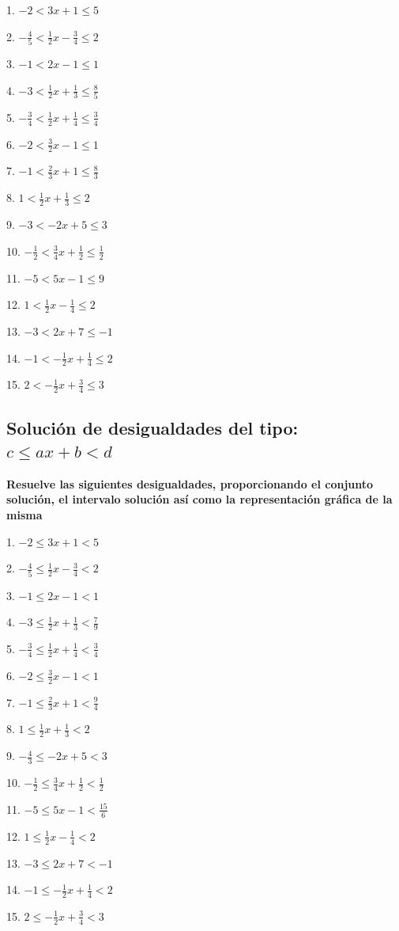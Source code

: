 \documentclass[]{book}
\begin{document}
\begin{multicols}{3}
1. $-2<3x+1\leq 5$

2. $-\frac{4}{5}< \frac{1}{2}x-\frac{3}{4}\leq2$

3. $-1<2x-1\leq 1$

4. $-3< \frac{1}{2}x+\frac{1}{3}\leq \frac{8}{5}$

5. $-\frac{3}{4}<\frac{1}{2}x+\frac{1}{4}\leq \frac{3}{4}$

6. $-2<\frac{3}{2}x-1\leq 1$

7. $-1<\frac{2}{3}x+1\leq \frac{8}{3}$

8. $1<\frac{1}{2}x+\frac{1}{3}\leq 2$

9. $-3< -2x+5\leq 3$

10. $-\frac{1}{2}<\frac{3}{4}x+\frac{1}{2}\leq \frac{1}{2}$

11. $-5<5x-1\leq 9$

12. $1<\frac{1}{2}x-\frac{1}{4}\leq 2$

13. $-3< 2x+7\leq -1$

14. $-1< -\frac{1}{2}x+\frac{1}{4}\leq 2$

15. $2<-\frac{1}{2}x+\frac{3}{4}\leq 3$
\end{multicols}

\subsection{\texorpdfstring{Solución de desigualdades del tipo:
\(c\leq ax+b <d\)}{Solución de desigualdades del tipo: c\textbackslash{}leq ax+b \textless{}d}}\label{soluciuxf3n-de-desigualdades-del-tipo-cleq-axb-d}

\textbf{Resuelve las siguientes desigualdades, proporcionando el
conjunto solución, el intervalo solución así como la representación
gráfica de la misma}

\begin{multicols}{3}
1. $-2\leq 3x+1<5$

2. $-\frac{4}{5}\leq \frac{1}{2}x-\frac{3}{4}<2$

3. $-1\leq 2x-1<1$

4. $-3\leq \frac{1}{2}x+\frac{1}{3}<\frac{7}{9}$

5. $-\frac{3}{4}\leq \frac{1}{2}x+\frac{1}{4}<\frac{3}{4}$

6. $-2\leq \frac{3}{2}x-1<1$

7. $-1\leq \frac{2}{3}x+1<\frac{9}{4}$

8. $1\leq \frac{1}{2}x+\frac{1}{3}<2$

9. $-\frac{4}{3}\leq -2x+5<3$

10. $-\frac{1}{2}\leq \frac{3}{4}x+\frac{1}{2}<\frac{1}{2}$

11. $-5\leq 5x-1<\frac{15}{6}$

12. $1\leq \frac{1}{2}x-\frac{1}{4}<2$

13. $-3\leq 2x+7<-1$

14. $-1\leq -\frac{1}{2}x+\frac{1}{4}<2$

15. $2\leq -\frac{1}{2}x+\frac{3}{4}<3$
\end{multicols}
\end{document}
